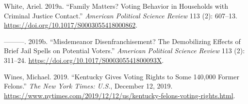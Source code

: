 \documentclass[
  12pt,
]{article}
\newlength{\cslhangindent}
\newenvironment{cslreferences}%
  {\setlength{\parindent}{0pt}%
  \everypar{\setlength{\hangindent}{\cslhangindent}}\ignorespaces}%
  {\par}
\begin{document}
\begin{cslreferences}
\leavevmode\hypertarget{ref-White2019a}{}%
White, Ariel. 2019a. ``Family Matters? Voting Behavior in Households with Criminal Justice Contact.'' \emph{American Political Science Review} 113 (2): 607--13. \url{https://doi.org/10.1017/S0003055418000862}.

\leavevmode\hypertarget{ref-White2019}{}%
---------. 2019b. ``Misdemeanor Disenfranchisement? The Demobilizing Effects of Brief Jail Spells on Potential Voters.'' \emph{American Political Science Review} 113 (2): 311--24. \url{https://doi.org/10.1017/S000305541800093X}.

\leavevmode\hypertarget{ref-Wines2019}{}%
Wines, Michael. 2019. ``Kentucky Gives Voting Rights to Some 140,000 Former Felons.'' \emph{The New York Times: U.S.}, December 12, 2019. \url{https://www.nytimes.com/2019/12/12/us/kentucky-felons-voting-rights.html}.
\end{cslreferences}
\end{document}
